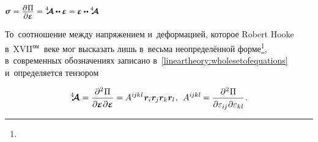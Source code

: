 \begin{otherlanguage}{russian}

\nopagebreak\vspace{-2.4em} ${\small \linearstress \hspace{.1ex} = \displaystyle \frac{\raisemath{-0.2em}{\partial\hspace{.1ex} \Pi}}{\raisemath{.04em}{\partial \mathboldepsilon}} = \stiffnesstensor \dotdotp \mathboldepsilon = \mathboldepsilon \dotdotp \stiffnesstensor}$ \nopagebreak\vspace{.55em}

\nopagebreak
То~соотношение между напряжением и~деформацией, которое Robert Hooke в~\hbox{XVII$^{\textrm{ом}}$\hspace{-0.12em}}~веке мог высказать лишь в~весьма неопределённой форме\footnote{\hspace*{.2em}}\hspace{-0.32em},\hspace{.24em} в~современных обозначениях записано в~\eqref{lineartheory:wholesetofequations} и~определяется тензором

\nopagebreak\vspace{-0.1em}\begin{equation}
\stiffnesstensor =
\displaystyle \frac{\partial^2 \hspace{.1ex} \Pi}{\raisemath{-0.1em}{\partial \mathboldepsilon \hspace{.1ex} \partial \mathboldepsilon}} = \hspace{-0.1ex}
A^{i\hspace{-0.1ex}jk\hspace{.06ex}l} \hspace{.16ex} \bm{r}_i \bm{r}_{\hspace{-0.12ex}j} \bm{r}_k \bm{r}_l
\hspace{.1ex} ,
\:\:
%
A^{i\hspace{-0.1ex}jk\hspace{.06ex}l} \hspace{-0.16ex} =
\displaystyle \frac{\partial^2 \hspace{.1ex} \Pi}{\raisemath{-0.1em}{\partial \varepsilon_{i\hspace{-0.1ex}j} \hspace{.1ex} \partial \varepsilon_{k\hspace{.06ex}l}}}
\hspace{.16ex} .
\end{equation}


\end{otherlanguage}
